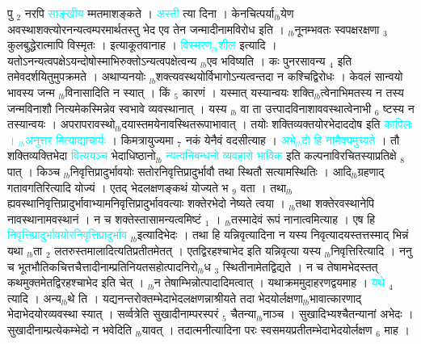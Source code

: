 \documentclass[article,12pt,a4paper]{memoir}%
\newcommand{\quotelemma}[1]{\textcolor{cyan}{#1}}
\begin{document}
	  
	  \pstart \leavevmode%
	पु {\tiny $_{2}$} नरपि \quotelemma{साङ्खीय} म्मतमाशङ्कते । \quotelemma{अस्ती} त्या \cite[4b8]{vn-msN} दिना । केनचित्पर्या{\tiny $_{lb}$}येण अवस्थाशक्त्योरनन्यत्वम्परमार्थतस्तु भेद एव तेन जन्मादीनामविरोध इति । {\tiny $_{lb}$}नूनम्भवतः स्वपक्षरक्षणा {\tiny $_{3}$} कुलबुद्धेरात्मापि विस्मृतः । इत्याकूतवानाह । \quotelemma{विस्मरण{\tiny $_{lb}$}शील} \cite[4b8]{vn-msN} इत्यादि । यतोऽनन्यत्वपक्षेऽयन्दोषोस्माभिरुक्तोऽन्यत्वपक्षेत्वन्य {\tiny $_{lb}$}एव भविष्यति । कः पुनरसावन्य {\tiny $_{4}$} इति तमेवदर्शयितुमुपक्रमते । अथाप्यनयोः {\tiny $_{lb}$}शक्त्यवस्थयोर्विभागोऽन्यत्वन्तदा न कश्चिद्विरोधः । केवलं सान्वयो भावस्य जन्म {\tiny $_{lb}$}विनासादिति न स्यात् । किं {\tiny $_{5}$} कारणं । यस्मात् यस्यान्वयः शक्ति{\tiny $_{lb}$}त्वेनाभिमतस्य न तस्य जन्मविनाशौ नित्यमेकस्मिन्नेव स्वभावे व्यवस्थानात् । यस्य {\tiny $_{lb}$} \leavevmode{} वा ता उत्त्पादविनाशाववस्थात्वेनाभी {\tiny $_{6}$} ष्टस्य न तस्यान्वयः । अपरापरावस्थो{\tiny $_{lb}$}दयास्तमयेनावस्थितरूपाभावात् । तयोः शक्तिव्यक्तयोरभेदाददोष इति \quotelemma{कापिलः । {\tiny $_{lb}$}अनुत्तर} \cite[4b10]{vn-msN} \quotelemma{मित्याद्याचार्यः} । किमत्रायुज्यमा {\tiny $_{7}$} नकं येनैवं वदसीत्याह । \quotelemma{अभे{\tiny $_{lb}$}दो हि नामैक्यमुच्यते} \cite[4b10]{vn-msN} । तौ शक्तिव्यक्तिभेदा \quotelemma{वित्ययञ्च} भेदाधिष्ठानो{\tiny $_{lb}$} \quotelemma{न्यत्वनिबन्धनो व्यवहारो भाविक} इति कल्पनाविरचितस्याप्रतिक्षे {\tiny $_{8}$} पात् । किञ्च {\tiny $_{lb}$}निवृत्तिप्रादुर्भावयोः सतोरनिवृत्तिप्रादुर्भावौ तथा स्थितौ सत्यामस्थितिः । आदि{\tiny $_{lb}$}ग्रहणाद् गतावगतिरित्यादि योज्यं । एतद् भेदलक्षणङ्कथं योज्यते भ {\tiny $_{9}$} \leavevmode{} वता । तथा{\tiny $_{lb}$}ह्यवस्थानिवृत्तिप्रादुर्भावाभ्यामनिवृत्तिप्रादुर्भाववत्याः शक्तेरभेदो नेष्यते त्वया । {\tiny $_{lb}$}तथा शक्तेरवस्थानेपि नावस्थानामवस्थानं । न च शक्तेस्तासामन्यत्वमिष्टं {\tiny $_{1}$} । {\tiny $_{lb}$}तस्मादेवं रूपं नानात्वमित्याह । एष हि \quotelemma{निवृत्तिप्रादुर्भावयोरनिवृत्तिप्रादुर्भाव} \cite[5a1]{vn-msN} {\tiny $_{lb}$}इत्यादिभेदः । तथा हि यन्निवृत्यादिना न यस्य निवृत्यादयस्तत्तस्माद् भिन्नं यथा {\tiny $_{lb}$}ता {\tiny $_{2}$} लतरुस्तमालादित्यतिप्रतीतमेतत् । एतद्विरहश्चाभेद इति यन्निवृत्या यस्य {\tiny $_{lb}$}निवृत्तिरित्यादि । ननु च भूतभौतिकचित्तचैत्तादीनाम्प्रतिनियतसहोत्पादनिरो{\tiny $_{lb}$}ध {\tiny $_{3}$} स्थितीनामेतद्विद्यते । न च तेषामभेदस्तत् कथमुक्तमेतद्विरहश्चाभेद इति चेत् । {\tiny $_{lb}$}न तेषाम्भिन्नोत्पादादिमत्वात् । यथाक्रममुदाहरणद्वयमाह । \quotelemma{यथे} {\tiny $_{4}$} त्यादि । अन्य{\tiny $_{lb}$}थे \cite[5a1]{vn-msN} ति । यद्यनन्तरोक्तम्भेदाभेदलक्षणन्नाश्रीयते तदा भेदयोर्लक्षणा{\tiny $_{lb}$}भावात्कारणाद् भेदाभेदयोरव्यवस्था स्यात् । सर्व्वत्रेति सुखादीनाम्परस्परं {\tiny $_{5}$} चैतन्या{\tiny $_{lb}$}नाञ्च । सुखादिभ्यश्चैतन्यानां अभेदः । सुखादीनाम्प्रत्येकम्भेदो न भवेदिति {\tiny $_{lb}$}यावत् । तदात्मनीत्यादिना परः स्वसमयप्रतीतम्भेदाभेदयोर्लक्षण {\tiny $_{6}$} माह । 
\end{document}
